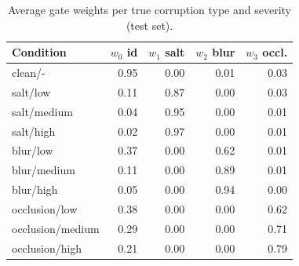 \begin{table}[t]
\centering
\caption{Average gate weights per true corruption type and severity (test set).}
\label{tab:t3_w}
\footnotesize
\begin{tabular}{lrrrr}
\toprule
Condition & $w_0$ id & $w_1$ salt & $w_2$ blur & $w_3$ occl. \\
\midrule
clean/- & 0.95 & 0.00 & 0.01 & 0.03 \\
salt/low & 0.11 & 0.87 & 0.00 & 0.03 \\
salt/medium & 0.04 & 0.95 & 0.00 & 0.01 \\
salt/high & 0.02 & 0.97 & 0.00 & 0.01 \\
blur/low & 0.37 & 0.00 & 0.62 & 0.01 \\
blur/medium & 0.11 & 0.00 & 0.89 & 0.01 \\
blur/high & 0.05 & 0.00 & 0.94 & 0.00 \\
occlusion/low & 0.38 & 0.00 & 0.00 & 0.62 \\
occlusion/medium & 0.29 & 0.00 & 0.00 & 0.71 \\
occlusion/high & 0.21 & 0.00 & 0.00 & 0.79 \\
\bottomrule
\end{tabular}
\end{table}
